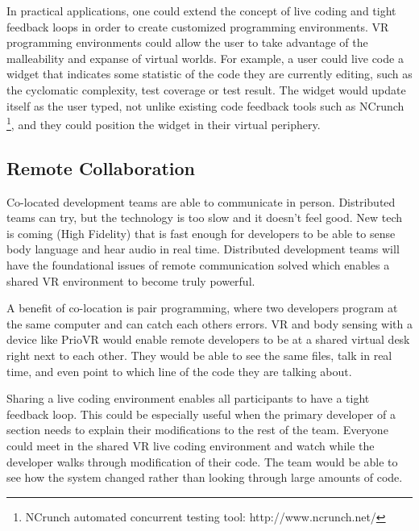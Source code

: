 \documentclass[conference]{IEEEtran}
\begin{document}
In practical applications, one could extend the concept of live coding and tight feedback loops in order to create customized programming environments. 
VR programming environments could allow the user to take advantage of the malleability and expanse of virtual worlds. 
For example, a user could live code a widget that indicates some statistic of the code they are currently editing, such as the cyclomatic complexity, test coverage or test result. 
The widget would update itself as the user typed, not unlike existing code feedback tools such as NCrunch \footnote{NCrunch automated concurrent testing tool: http://www.ncrunch.net/}, and they could position the widget in their virtual periphery.

\subsection{Remote Collaboration}


Co-located development teams are able to communicate in person. 
Distributed teams can try, but the technology is too slow and it doesn't feel good. 
New tech is coming (High Fidelity) that is fast enough for developers to be able to sense body language and hear audio in real time.  
Distributed development teams will have the foundational issues of remote communication solved which enables a shared VR environment to become truly powerful.

A benefit of co-location is pair programming, where two developers program at the same computer and can catch each others errors. 
VR and body sensing with a device like PrioVR would enable remote developers to be at a shared virtual desk right next to each other. 
They would be able to see the same files, talk in real time, and even point to which line of the code they are talking about. 

Sharing a live coding environment enables all participants to have a tight feedback loop. 
This could be especially useful when the primary developer of a section needs to explain their modifications to the rest of the team. 
Everyone could meet in the shared VR live coding environment and watch while the developer walks through modification of their code. 
The team would be able to see how the system changed rather than looking through large amounts of code.
\end{document}
